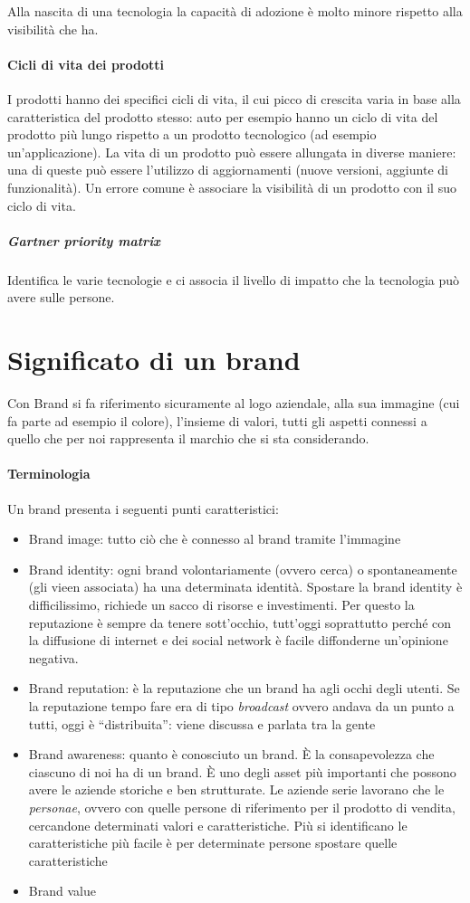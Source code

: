 Alla nascita di una tecnologia la capacità di adozione è molto minore rispetto
alla visibilità che ha.

\paragraph*{Cicli di vita dei prodotti} I prodotti hanno dei specifici cicli di
vita, il cui picco di crescita varia in base alla caratteristica del prodotto
stesso: auto per esempio hanno un ciclo di vita del prodotto più lungo rispetto
a un prodotto tecnologico (ad esempio un'applicazione). La vita di un prodotto
può essere allungata in diverse maniere: una di queste può essere l'utilizzo di
aggiornamenti (nuove versioni, aggiunte di funzionalità).
Un errore comune è associare la visibilità di un prodotto con il suo ciclo di
vita.

\subparagraph*{Gartner priority matrix} Identifica le varie tecnologie e ci
associa il livello di impatto che la tecnologia può avere sulle persone.

\section{Significato di un brand}

Con Brand si fa riferimento sicuramente al logo aziendale, alla sua immagine
(cui fa parte ad esempio il colore), l'insieme di valori, tutti gli aspetti
connessi a quello che per noi rappresenta il marchio che si sta considerando.

\paragraph*{Terminologia} Un brand presenta i seguenti punti caratteristici:
\begin{itemize}
 \item Brand image: tutto ciò che è connesso al brand tramite l'immagine
 \item Brand identity: ogni brand volontariamente (ovvero cerca) o
spontaneamente (gli vieen associata) ha una determinata identità. Spostare la
brand identity è difficilissimo, richiede un sacco di risorse e investimenti.
Per questo la reputazione è sempre da tenere sott'occhio, tutt'oggi soprattutto
perché con la diffusione di internet e dei social network è facile diffonderne
un'opinione negativa.
 \item Brand reputation: è la reputazione che un brand ha agli occhi degli
utenti. Se la reputazione tempo fare era di tipo \textit{broadcast} ovvero
andava da un punto a tutti, oggi è ``distribuita'': viene discussa e parlata
tra la gente
 \item Brand awareness: quanto è conosciuto un brand. È la consapevolezza che
ciascuno di noi ha di un brand. È uno degli asset più importanti che possono
avere le aziende storiche e ben strutturate. Le aziende serie lavorano che le
\textit{personae}, ovvero con quelle persone di riferimento per il prodotto di
vendita, cercandone determinati valori e caratteristiche. Più si identificano
le caratteristiche più facile è per determinate persone spostare quelle
caratteristiche
 \item Brand value
\end{itemize}

